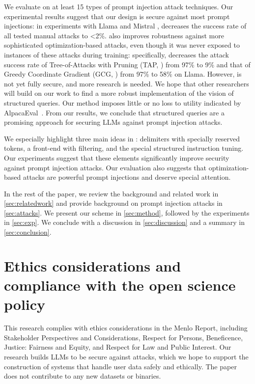 We evaluate \frameworkname on at least 15 types of prompt injection attack techniques.
Our experimental results suggest that our design is secure against most prompt injections:
in experiments with Llama \cite{touvron2023llama} and Mistral \cite{jiang2023mistral}, \frameworkname decreases the success rate of all tested manual attacks to <2\%. \frameworkname also improves robustness against more sophisticated optimization-based attacks, even though it was never exposed to instances of these attacks during training: specifically, \frameworkname decreases the attack success rate of Tree-of-Attacks with Pruning (TAP, \cite{mehrotra2023tree}) from 97\% to 9\% and that of Greedy Coordinate Gradient (GCG, \cite{zou2023universal}) from 97\% to 58\% on Llama. However, \frameworkname is not yet fully secure, and more research is needed. We hope that other researchers will build on our work to find a more robust implementation of the vision of structured queries. 
Our method imposes little or no loss to utility indicated by AlpacaEval~\cite{alpaca_eval}.
From our results, we conclude that structured queries are a promising approach for securing LLMs against prompt injection attacks.

We especially highlight three main ideas in \frameworkname: delimiters with specially reserved tokens, a front-end with filtering, and the special structured instruction tuning.
Our experiments suggest that these elements significantly improve security against prompt injection attacks.
Our evaluation also suggests that optimization-based attacks are powerful prompt injections and deserve special attention.

In the rest of the paper, we review the background and related work in \cref{sec:relatedwork} and provide background on prompt injection attacks in \cref{sec:attacks}. We present our scheme in \cref{sec:method}, followed by the experiments in \cref{sec:exp}. We conclude with a discussion in \cref{sec:discussion} and a summary in \cref{sec:conclusion}.











\section*{Ethics considerations and compliance with the open science policy} %
This research complies with ethics considerations in the Menlo Report, including Stakeholder Perspectives and Considerations, Respect for Persons, Beneficence, Justice: Fairness and Equity, and Respect for Law and Public Interest. Our research builds LLMs to be secure against attacks, which we hope to support the construction of systems that handle user data safely and ethically.
The paper does not contribute to any new datasets or binaries.


